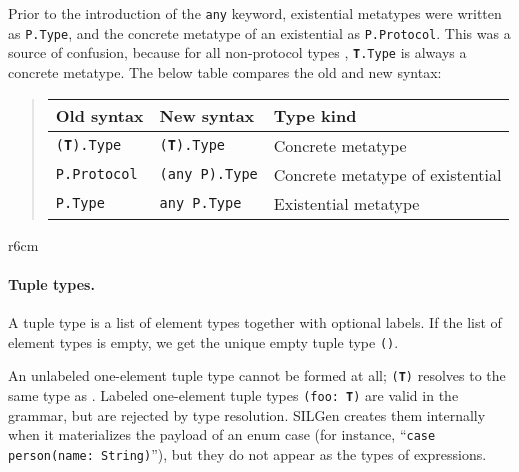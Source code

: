 \documentclass[../generics]{subfiles}
\begin{document}
Prior to the introduction of the \texttt{any} keyword, existential metatypes were written as \texttt{P.Type}, and the concrete metatype of an existential as \texttt{P.Protocol}. This was a source of confusion, because for all non-protocol types , \texttt{\textbf{T}.Type} is always a concrete metatype. The below table compares the old and new syntax:
\begin{quote}
\begin{tabular}{lll}
\toprule
\textbf{Old syntax}&\textbf{New syntax}&\textbf{Type kind}\\
\midrule
\texttt{(\textbf{T}).Type}&\texttt{(\textbf{T}).Type}&Concrete metatype\\
\texttt{P.Protocol}&\texttt{(any P).Type}&Concrete metatype of existential\\
\texttt{P.Type}&\texttt{any P.Type}&Existential metatype\\
\bottomrule
\end{tabular}
\end{quote}

\begin{wrapfigure}[12]{r}{6cm}
\begin{center}
\end{center}
\end{wrapfigure}

\paragraph{Tuple types.}
A tuple type is a list of element types together with optional labels. If the list of element types is empty, we get the unique empty tuple type \texttt{()}.

An unlabeled one-element tuple type cannot be formed at all; \texttt{(\textbf{T})} resolves to the same type as . Labeled one-element tuple types \texttt{(foo:\ \textbf{T})} are valid in the grammar, but are rejected by type resolution. SILGen creates them internally when it materializes the payload of an enum case (for instance, ``\texttt{case person(name:\ String)}''), but they do not appear as the types of expressions.
\end{document}
